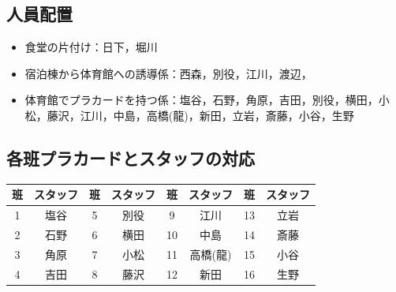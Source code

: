 \vspace{-3mm}
\subsection{人員配置}
\begin{itemize}
\item 食堂の片付け：日下，堀川

\item 宿泊棟から体育館への誘導係：西森，別役，江川，渡辺，
\item 体育館でプラカードを持つ係：塩谷，石野，角原，吉田，別役，横田，小松，藤沢，江川，中島，高橋(龍)，新田，立岩，斎藤，小谷，生野
\end{itemize}

\subsection{各班プラカードとスタッフの対応}
\begin{table}[h]
\begin{center}
\label{sec:card}
\begin{tabular}{|c|c||c|c||c|c||c|c|}
\hline
{班}&{スタッフ}&{班}&{スタッフ}&{班}&{スタッフ}&{班}&{スタッフ} \\ \hline\hline
1 & 塩谷 & 5 & 別役 &  9 & 江川 & 13 & 立岩 \\ \hline
2 & 石野 & 6 & 横田 & 10 & 中島 & 14 & 斎藤 \\ \hline
3 & 角原 & 7 & 小松 & 11 & 高橋(龍) & 15 & 小谷 \\ \hline
4 & 吉田 & 8 & 藤沢 & 12 & 新田 &16 & 生野 \\ \hline
\end{tabular}
\end{center}
\end{table}

\vspace{-3mm}

